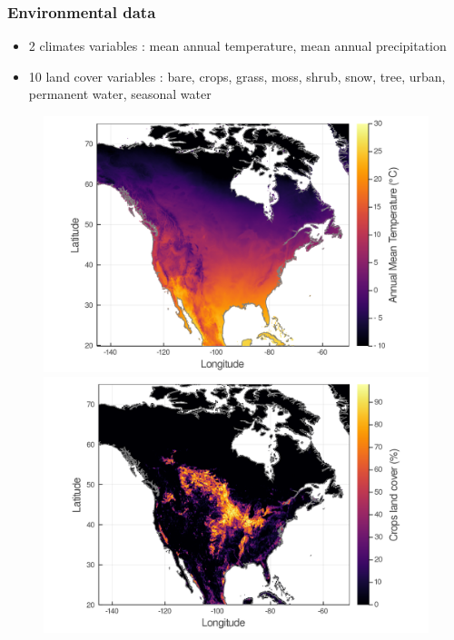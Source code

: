 \documentclass[10pt, aspectratio=1610]{beamer}
\begin{document}
\begin{frame}
  \frametitle{Environmental data}
  \hspace*{0.5cm}
  \begin{itemize}
    \item 2 climates variables : mean annual temperature, mean annual precipitation
    \item 10 land cover variables : bare, crops, grass, moss, shrub, snow, tree, urban, permanent water, seasonal water
  \end{itemize}
  \begin{figure}
    \centering
    \hspace*{-0.5cm}\includegraphics[scale=0.12]{fig/wc_temp.png}%
    \hspace*{0.5cm}\includegraphics[scale=0.12]{fig/lc_temp.png}
  \end{figure}
  \begin{figure}

\end{figure}
\end{frame}
\end{document}
